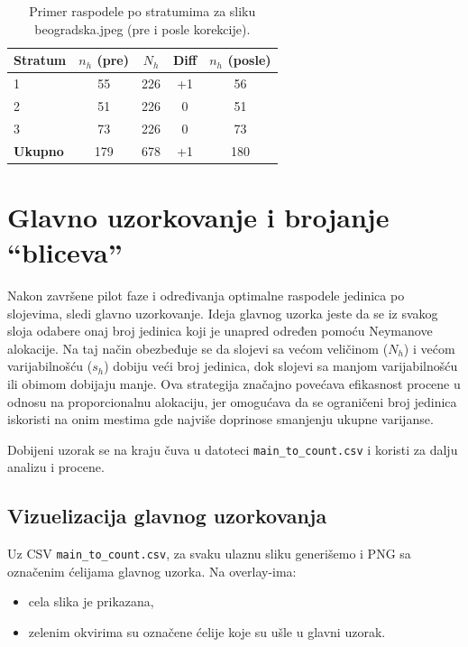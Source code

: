 \documentclass[a4paper,12pt]{article}
\begin{document}
\begin{table}[H]
\centering
\begin{tabular}{lcccc}
\hline
Stratum & $n_h$ (pre) & $N_h$ & Diff & $n_h$ (posle) \\
\hline
1 & 55 & 226 & +1 & 56 \\
2 & 51 & 226 & 0  & 51 \\
3 & 73 & 226 & 0  & 73 \\
\hline
\textbf{Ukupno} & 179 & 678 & +1 & 180 \\
\hline
\end{tabular}
\caption{Primer raspodele po stratumima za sliku beogradska.jpeg (pre i posle korekcije).}
\label{tab:alloc-beogradska}
\end{table}

\section{Glavno uzorkovanje i brojanje “bliceva”}

Nakon završene pilot faze i određivanja optimalne raspodele jedinica po slojevima, 
sledi glavno uzorkovanje. Ideja glavnog uzorka jeste da se iz svakog sloja odabere 
onaj broj jedinica koji je unapred određen pomoću Neymanove alokacije. 
Na taj način obezbeđuje se da slojevi sa većom veličinom ($N_h$) i većom varijabilnošću ($s_h$) 
dobiju veći broj jedinica, dok slojevi sa manjom varijabilnošću ili obimom dobijaju manje. 
Ova strategija značajno povećava efikasnost procene u odnosu na proporcionalnu alokaciju, 
jer omogućava da se ograničeni broj jedinica iskoristi na onim mestima gde najviše doprinose 
smanjenju ukupne varijanse.

Dobijeni uzorak se na kraju čuva u datoteci 
\texttt{main\_to\_count.csv} i koristi za dalju analizu i procene.

\subsection{Vizuelizacija glavnog uzorkovanja}

Uz CSV \texttt{main\_to\_count.csv}, za svaku ulaznu sliku generišemo i PNG sa označenim ćelijama glavnog uzorka. Na overlay-ima:
\begin{itemize}
	\item cela slika je prikazana,
	\item zelenim okvirima su označene ćelije koje su ušle u glavni uzorak.
\end{itemize}
\end{document}
